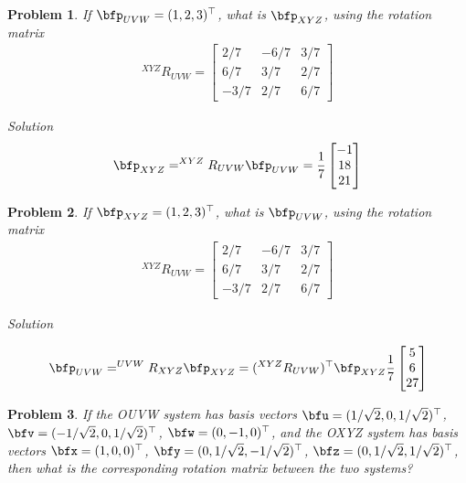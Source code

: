 \documentclass{article}
\newtheorem{prob}{Problem}
\numberwithin{prob}{section}
\newenvironment{solution}{\emph{Solution}}{}
\begin{document}
\begin{prob}
  If $\bfp_{UVW} = (1, 2, 3)^\top$, what is $\bfp_{XYZ}$,
  using the rotation matrix
  \begin{align}
  ^{XYZ}R_{UVW} = \begin{bmatrix}
    2/7 & -6/7 & 3/7\\
   6/7 & 3/7 & 2/7\\
   -3/7 & 2/7 & 6/7
  \end{bmatrix}
\end{align}
\end{prob}
\begin{solution}
\begin{align}
  \bfp_{XYZ} = ^{XYZ}R_{UVW} \bfp_{UVW} = \frac{1}{7}\begin{bmatrix} -1 \\ 18 \\ 21\end{bmatrix}
\end{align}

\end{solution}
\begin{prob}
  If $\bfp_{XYZ} = (1, 2, 3)^\top$, what is $\bfp_{UVW}$,
  using the rotation matrix
  \begin{align}
  ^{XYZ}R_{UVW} = \begin{bmatrix}
    2/7 & -6/7 & 3/7\\
   6/7 & 3/7 & 2/7\\
   -3/7 & 2/7 & 6/7
  \end{bmatrix}
\end{align}
\end{prob}
\begin{solution}

\begin{align}
  \bfp_{UVW} = ^{UVW}R_{XYZ} \bfp_{XYZ} = (^{XYZ}R_{UVW})^\top \bfp_{XYZ}
  \frac{1}{7}\begin{bmatrix} 5 \\ 6 \\ 27 \end{bmatrix}
\end{align}

\end{solution}

\begin{prob}
If the OUVW system has basis vectors $\bfu = (1/\sqrt2, 0, 1/\sqrt2)^\top$, $\bfv = (-1/\sqrt2, 0, 1/\sqrt2)^\top$, $\bfw = (0, -1, 0)^\top$, and the OXYZ system has basis vectors $\bfx = (1, 0, 0)^\top$, $\bfy = (0, 1/\sqrt2, -1/\sqrt2)^\top$, $\bfz = (0, 1/\sqrt2, 1/\sqrt2)^\top$, then what is the corresponding rotation matrix between the two systems? 
\end{prob}
\end{document}
